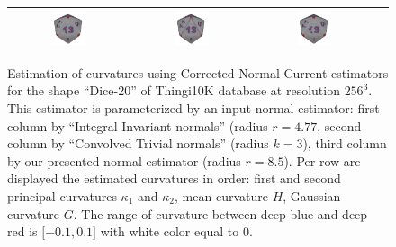 \documentclass[runningheads]{llncs}
\begin{document}
\begin{figure}
\begin{center}
\begin{tabular}{|c||c|c|c|}
          \includegraphics[width=0.3\textwidth]{pictures/d20-G-II}&
          \includegraphics[width=0.3\textwidth]{pictures/d20-G-CTriv}&
          \includegraphics[width=0.3\textwidth]{pictures/d20-G-NV}\\ \hline
        \end{tabular}
      \end{center}
      \caption{Estimation of curvatures using Corrected Normal Current
        estimators \cite{lachaud:2022-dcg} for the shape ``Dice-20'' of Thingi10K
        database at resolution $256^3$. This estimator is
        parameterized by an input normal estimator: first column by
        ``Integral Invariant normals'' (radius $r=4.77$, second column
        by ``Convolved Trivial normals'' (radius $k=3$), third column
        by our presented normal estimator (radius $r=8.5$). Per row are displayed the
        estimated curvatures in order: first and second principal
        curvatures $\kappa_1$ and $\kappa_2$, mean curvature $H$,
        Gaussian curvature $G$. The range of curvature between deep
        blue and deep red is $\lbrack -0.1, 0.1 \rbrack$ with white
        color equal to $0$.}
    \end{figure}

\end{document}
